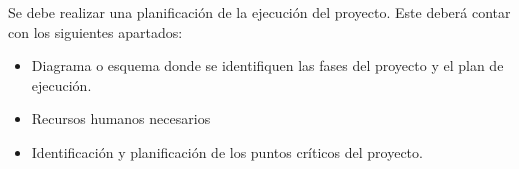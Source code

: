 \clearpage
{}

Se debe realizar una planificación de la ejecución del proyecto.
Este deberá contar con los siguientes apartados:
\begin{itemize}
	\item Diagrama o esquema donde se identifiquen las fases del proyecto y el plan de ejecución.
	\item Recursos humanos necesarios
	\item Identificación y planificación de los puntos críticos del proyecto.
\end{itemize}
